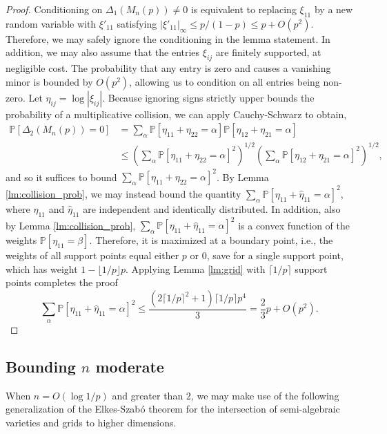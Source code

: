 \documentclass[reqno]{amsart}
\numberwithin{equation}{section}
\begin{document}
\begin{proof}
Conditioning on $\Delta_1(M_n(p)) \ne 0$ is equivalent to replacing $\xi_{11}$ by a new random variable with $\xi'_{11}$ satisfying $|\xi'_{11}|_\infty \le p/(1-p) \le p + O(p^2)$. Therefore, we may safely ignore the conditioning in the lemma statement. In addition, we may also assume that the entries $\xi_{ij}$ are finitely supported, at negligible cost. The probability that any entry is zero and causes a vanishing minor is bounded by $O(p^2)$, allowing us to condition on all entries being non-zero. Let $\eta_{ij} = \log |\xi_{ij}|$. Because ignoring signs strictly upper bounds the probability of a multiplicative collision, we can apply Cauchy-Schwarz to obtain,
\begin{align*}
    \mathbb{P}\left[ \Delta_2(M_n(p)) = 0 \right] &= \sum_{\alpha} \mathbb{P}\left[\eta_{11}+\eta_{22} = \alpha \right] \mathbb{P}\left[\eta_{12}+\eta_{21} = \alpha \right] \\
    &\le \left( \sum_{\alpha} \mathbb{P}\left[\eta_{11}+\eta_{22} = \alpha\right]^2\right)^{1/2} \left( \sum_{\alpha} \mathbb{P}\left[\eta_{12}+\eta_{21} = \alpha\right]^2\right)^{1/2}, 
\end{align*} 
and so it suffices to bound $\sum_{\alpha} \mathbb{P}\left[\eta_{11}+\eta_{22} = \alpha\right]^2$. By Lemma \ref{lm:collision_prob}, we may instead bound the quantity $\sum_{\alpha} \mathbb{P}\left[\eta_{11}+\hat \eta_{11} = \alpha\right]^2$, where $\eta_{11}$ and $\hat \eta_{11}$ are independent and identically distributed. In addition, also by Lemma \ref{lm:collision_prob}, $\sum_{\alpha} \mathbb{P}\left[\eta_{11}+\hat \eta_{11} = \alpha\right]^2$ is a convex function of the weights $\mathbb{P}[\eta_{11} = \beta]$. Therefore, it is maximized at a boundary point, i.e., the weights of all support points equal either $p$ or $0$, save for a single support point, which has weight $1-\lfloor 1/p\rfloor p$. Applying Lemma \ref{lm:grid} with $\lceil 1/p \rceil$ support points completes the proof
\[\sum_{\alpha} \mathbb{P}\left[\eta_{11}+\hat \eta_{11} = \alpha\right]^2 \le \frac{(2\lceil 1/p \rceil^2+1)\lceil 1/p \rceil p^4}{3} = \frac{2}{3} p + O(p^2).\]
\end{proof}



\subsection{Bounding $n$ moderate} When $n = O(\log 1/p)$ and greater than $2$, we may make use of the following generalization of the Elkes-Szab{\'o} theorem for the intersection of semi-algebraic varieties and grids to higher dimensions.
\end{document}
